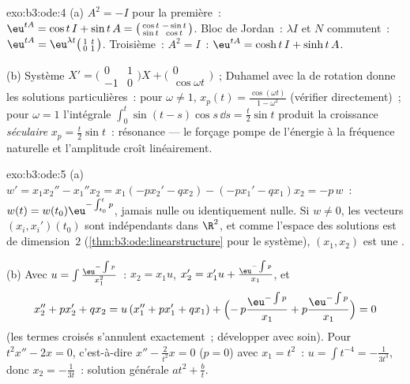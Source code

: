 \begin{solution}{exo:b3:ode:4}
(a) $A^2 = -I$ pour la première~: $\eu^{tA} = \cos t\,I +
\sin t\,A = \bigl(\begin{smallmatrix}\cos t & -\sin t\\ \sin
t & \cos t\end{smallmatrix}\bigr)$. Bloc de Jordan~: $\lambda
I$ et $N$ commutent~: $\eu^{tA} =
\eu^{\lambda t}\bigl(\begin{smallmatrix}1 & t\\ 0 &
1\end{smallmatrix}\bigr)$. Troisième~: $A^2 = I$~: $\eu^{tA}
= \cosh t\,I + \sinh t\,A$.

(b) Système $X' = \bigl(\begin{smallmatrix}0&1\\-1&0
\end{smallmatrix}\bigr)X + \bigl(\begin{smallmatrix}0\\
\cos\omega t\end{smallmatrix}\bigr)$~; Duhamel avec la
 de rotation donne les solutions particulières~:
pour $\omega \neq 1$, $x_p(t) = \frac{\cos(\omega t)}{1 -
\omega^2}$ (vérifier directement)~; pour $\omega = 1$
l'intégrale $\int_0^t\sin(t - s)\cos s\,\dd s = \frac
t2\sin t$ produit la croissance \emph{séculaire} $x_p =
\frac t2\sin t$~: résonance --- le forçage pompe de l'énergie
à la fréquence naturelle et l'amplitude croît linéairement.
\end{solution}

\begin{solution}{exo:b3:ode:5}
(a) $w' = x_1x_2'' - x_1''x_2 = x_1(-px_2' - qx_2) - (-px_1'
- qx_1)x_2 = -p\,w$~: $w(t) = w(t_0)\eu^{-\int_{t_0}^tp}$,
jamais nulle ou identiquement nulle. Si $w \neq 0$, les
vecteurs $(x_i, x_i')(t_0)$ sont indépendants dans $\R^2$, et
comme l'espace des solutions est de dimension~$2$
(\cref{thm:b3:ode:linearstructure} pour le système), $(x_1,
x_2)$ est une .

(b) Avec $u = \int\frac{\eu^{-\int p}}{x_1^2}$~: $x_2 =
x_1u$, $x_2' = x_1'u + \frac{\eu^{-\int p}}{x_1}$, et
\[
x_2'' + px_2' + qx_2
= u\,(x_1'' + px_1' + qx_1) +
\Bigl(-\,p\frac{\eu^{-\int p}}{x_1} +
p\frac{\eu^{-\int p}}{x_1}\Bigr) = 0
\]
(les termes croisés s'annulent exactement~; développer avec
soin). Pour $t^2x'' - 2x = 0$, c'est-à-dire $x'' -
\frac2{t^2}x = 0$ ($p = 0$) avec $x_1 = t^2$~: $u = \int
t^{-4} = -\frac1{3t^3}$, donc $x_2 = -\frac1{3t}$~: solution
générale $at^2 + \frac bt$.
\end{solution}

